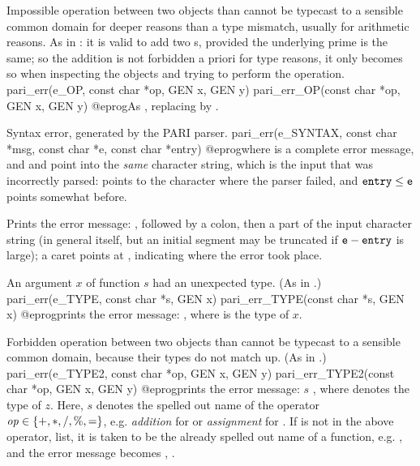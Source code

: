  Impossible operation between two objects than cannot be
typecast to a sensible common domain for deeper reasons than a type mismatch,
usually for arithmetic reasons. As in  : it is valid to add
two s, provided the underlying prime is the same; so the addition
is not forbidden a priori for type reasons, it only becomes so when
inspecting the objects and trying to perform the operation.
\bprog
  pari_err(e_OP, const char *op, GEN x, GEN y)
  pari_err_OP(const char *op, GEN x, GEN y)
@eprog\noindent As , replacing  by
.

 Syntax error, generated by the PARI parser.
\bprog
  pari_err(e_SYNTAX, const char *msg, const char *e, const char *entry)
@eprog\noindent where  is a complete error message, and  and
 point into the \emph{same} character string, which is the input
that was incorrectly parsed:  points to the character where the parser
failed, and ${\tt entry}\leq {\tt e}$ points somewhat before.

\noindent Prints the error message: , followed by a colon, then
a part of the input character string (in general  itself, but an
initial segment may be truncated if ${\tt e}-{\tt entry}$ is large); a caret
points at , indicating where the error took place.

 An argument $x$ of function $s$ had an unexpected type.
(As in .)
\bprog
  pari_err(e_TYPE, const char *s, GEN x)
  pari_err_TYPE(const char *s, GEN x)
@eprog\noindent prints the error message: , where  is the type of $x$.

 Forbidden operation between two objects than cannot be
typecast to a sensible common domain, because their types do not match up.
(As in .)
\bprog
  pari_err(e_TYPE2, const char *op, GEN x, GEN y)
  pari_err_TYPE2(const char *op, GEN x, GEN y)
@eprog\noindent prints the error message:  $s$
  , where  denotes the type of $z$.
Here, $s$ denotes the spelled out name of the operator
$\hbox{\it op\/}\in\{{\tt +}, {\tt *}, {\tt /}, {\tt \%}, {\tt =}\}$, e.g.
\emph{addition} for  or \emph{assignment} for . If 
is not in the above operator, list, it is taken to be the already spelled out
name of a function, e.g. , and the error message becomes
  , .

